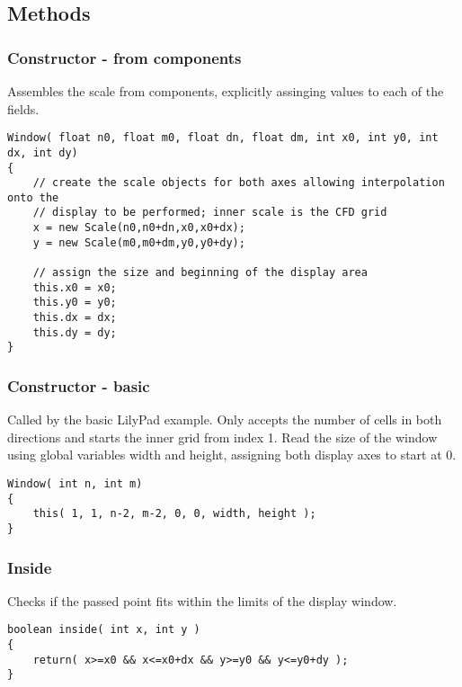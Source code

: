 \documentclass[notitlepage]{article}
\begin{document}
\subsection{Methods}

\subsubsection{Constructor - from components}

Assembles the scale from components, explicitly assinging values to each of the fields.

\begin{lstlisting}[style=myCpp]
Window( float n0, float m0, float dn, float dm, int x0, int y0, int dx, int dy)
{
	// create the scale objects for both axes allowing interpolation onto the
	// display to be performed; inner scale is the CFD grid
	x = new Scale(n0,n0+dn,x0,x0+dx);
	y = new Scale(m0,m0+dm,y0,y0+dy);
	
	// assign the size and beginning of the display area
	this.x0 = x0;
	this.y0 = y0;
	this.dx = dx;
	this.dy = dy;
}
\end{lstlisting}

\subsubsection{Constructor - basic}

Called by the basic LilyPad example. Only accepts the number of cells in both directions
and starts the inner grid from index 1. Read the size of the window using
global variables width and height, assigning both display axes to start at 0.

\begin{lstlisting}[style=myCpp]
Window( int n, int m)
{
	this( 1, 1, n-2, m-2, 0, 0, width, height );
}
\end{lstlisting}

\subsubsection{Inside}

Checks if the passed point fits within the limits of the display window.

\begin{lstlisting}[style=myCpp]
boolean inside( int x, int y )
{
	return( x>=x0 && x<=x0+dx && y>=y0 && y<=y0+dy );
}
\end{lstlisting}
\end{document}
